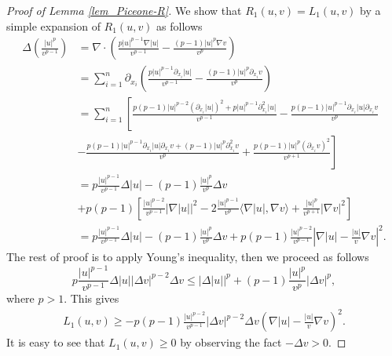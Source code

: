 \documentclass[10pt,a4paper]{amsart}
\begin{document}
\begin{proof}[Proof of Lemma \ref{lem_Piceone-R}]
	We show that $R_1(u,v)=L_1(u,v)$ by a simple expansion of $R_1(u,v)$ as follows 
	\begin{align*}
	\Delta\left( \frac{|u|^p}{v^{p-1}} \right) &= \nabla \cdot \left( \frac{p|u|^{p-1}\nabla|u| }{v^{p-1}} - \frac{(p-1)|u|^p\nabla v}{v^p} \right)\\
	& = \sum_{i=1}^{n} \partial_{x_i} \left( \frac{p|u|^{p-1} \partial_{x_i}|u| }{v^{p-1}} - \frac{(p-1)|u|^p \partial_{x_i} v}{v^p} \right)\\
	& =  \sum_{i=1}^{n} \left[ \frac{ p(p-1)|u|^{p-2}( \partial_{x_i}|u|)^2 + p|u|^{p-1}\partial_{x_i}^2|u|  }{v^{p-1}} - \frac{p(p-1) |u|^{p-1} \partial_{x_i}|u|\partial_{x_i}v }{v^{p}} \right.\\
	& - \left.  \frac{p(p-1)|u|^{p-1}\partial_{x_i}|u|\partial_{x_i} v + (p-1)|u|^p \partial_{x_i}^2v }{v^p} +  \frac{p(p-1)|u|^p (\partial_{x_i} v)^2}{v^{p+1}} \right] \\
	& = p \frac{|u|^{p-1}}{v^{p-1}}\Delta |u| - (p-1)\frac{|u|^p}{v^p}\Delta v \\
	& + p(p-1)\left[ \frac{|u|^{p-2}}{v^{p-1}} |\nabla |u||^2 -2 \frac{|u|^{p-1}}{v^p}\langle \nabla |u|, \nabla v\rangle + \frac{|u|^{p}}{v^{p+1}} |\nabla v|^2 \right]\\ 
	& =  p \frac{|u|^{p-1}}{v^{p-1}}\Delta |u| - (p-1)\frac{|u|^p}{v^p}\Delta v  + p(p-1) \frac{|u|^{p-2}}{v^{p-1}} \left| \nabla |u| - \frac{|u|}{v} \nabla v \right|^2.
	\end{align*}
	The rest of proof is to apply Young's inequality, then we proceed as follows
	\begin{equation*}
	p	\frac{|u|^{p-1}}{v^{p-1}} \Delta |u| |\Delta v|^{p-2} \Delta v \leq |\Delta |u||^p + (p-1) \frac{|u|^p}{v^p}|\Delta v|^p,
	\end{equation*}
	where $p>1$. This gives
	\begin{align*}
	L_1(u,v)\geq - p(p-1)\frac{|u|^{p-2}}{v^{p-1}} |\Delta v|^{p-2} \Delta v \left( \nabla |u| - \frac{|u|}{v} \nabla v\right)^2.
	\end{align*}
	It is easy to see that $L_1(u,v)\geq 0$ by observing the fact $-\Delta v >0$.	
\end{proof}
\end{document}
